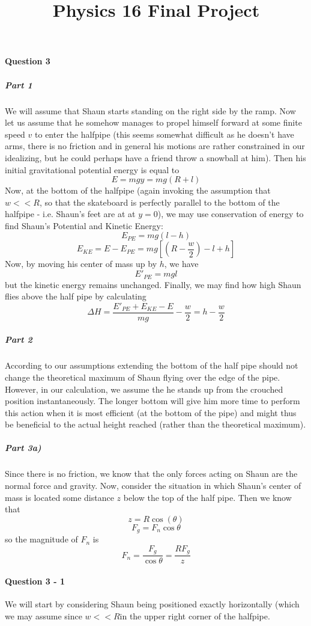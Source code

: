 \title{Physics 16 Final Project}

\paragraph{Question 3}
\subparagraph{Part 1}
We will assume that Shaun starts standing on the right side by the ramp. Now let us assume that he somehow manages to propel himself forward at some finite speed $v$ to enter the halfpipe (this seems somewhat difficult as he doesn't have arms, there is no friction and in general his motions are rather constrained in our idealizing, but he could perhaps have a friend throw a snowball at him). 
Then his initial gravitational potential energy is equal to
\[ E = mgy = mg(R+l) \]
Now, at the bottom of the halfpipe (again invoking the assumption that $w<<R$, so that the skateboard is perfectly parallel to the bottom of the halfpipe - i.e. Shaun's feet are at at $y=0$), we may use conservation of energy to find Shaun's Potential and Kinetic Energy:
\[ E_{PE} = mg(l-h) \]
\[ E_{KE} = E - E_{PE} = mg[(R-\frac{w}{2})-l+h] \]
Now, by moving his center of mass up by $h$, we have
\[ E'_{PE} = mgl \]
but the kinetic energy remains unchanged. Finally, we may find how high Shaun flies above the half pipe by calculating
\[ \Delta H = \frac{E'_{PE}+E_{KE}-E}{mg} - \frac{w}{2} = h- \frac{w}{2}  \]
\subparagraph{Part 2}
According to our assumptions extending the bottom of the half pipe should not change the theoretical maximum of Shaun flying over the edge of the pipe. However, in our calculation, we assume the he stands up from the crouched position instantaneously. The longer bottom will give him more time to perform this action when it is most efficient (at the bottom of the pipe) and might thus be beneficial to the actual height reached (rather than the theoretical maximum).

\subparagraph{Part 3a)}
Since there is no friction, we know that the only forces acting on Shaun are the normal force and gravity. Now, consider the situation in which Shaun's center of mass is located some distance $z$ below the top of the half pipe. Then we know that
\[ z=R\cos(\theta) \]
\[ F_g = F_n\cos\theta \] 
so the magnitude of $F_n$ is 
\[ F_n = \frac{F_g}{\cos\theta} = \frac{RF_g}{z} \]



\paragraph{Question 3 - 1}
We will start by considering Shaun being positioned exactly horizontally (which we may assume since $w << R$in the upper right corner of the halfpipe.

